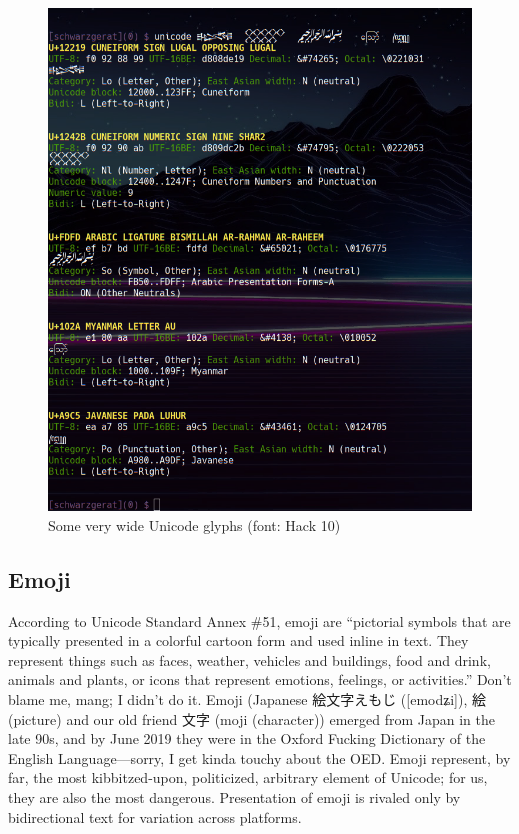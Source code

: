 \begin{figure}[!htb]
\centering
\includegraphics[width=1\linewidth]{media/wide-unicode.png}
\caption[Some very wide Unicode glyphs.]{Some very wide Unicode glyphs (font: Hack 10)}
\label{fig:wideglyphs}
\end{figure}

\subsection{Emoji}
According to Unicode Standard Annex \#51\cite{annex51}, emoji are ``pictorial
symbols that are typically presented in a colorful cartoon form and used
inline in text. They represent things such as faces, weather, vehicles and
buildings, food and drink, animals and plants, or icons that represent
emotions, feelings, or activities.''
Don't blame me, mang; I didn't do it. Emoji (Japanese 絵文字えもじ ([{emodʑi}]),
絵 (picture) and our old friend 文字 (moji (character)) emerged from Japan
in the late 90s, and by June 2019 they were in the Oxford Fucking Dictionary of
the English Language\cite{oedgay}---sorry, I get kinda touchy about the OED.
Emoji represent, by far, the most kibbitzed-upon, politicized, arbitrary
element of Unicode; for us, they are also the most dangerous. Presentation of
emoji is rivaled only by bidirectional text for variation across platforms.

